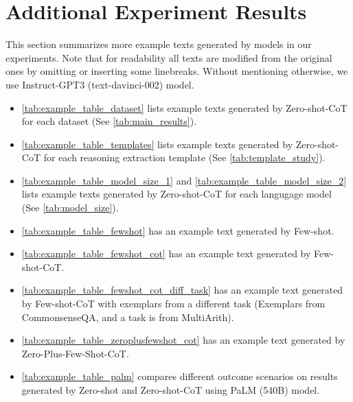 \documentclass{article}
\newcommand{\ours}{Zero-shot-CoT\xspace}
\newcommand{\theirs}{Few-shot-CoT\xspace}
\newcommand{\theirsz}{Zero-shot\xspace}
\newcommand{\theirsf}{Few-shot\xspace}
\begin{document}
\section{Additional Experiment Results}
\label{appx:further_experiment}

This section summarizes more example texts generated by models in our experiments.
Note that for readability all texts are modified from the original ones by omitting or inserting some linebreaks. Without mentioning otherwise, we use Instruct-GPT3 (text-davinci-002) model.

\begin{itemize}
    \item \autoref{tab:example_table_dataset} lists example texts generated by \ours for each dataset (See \autoref{tab:main_results}).
    \item \autoref{tab:example_table_templates} lists example texts generated by \ours for each reasoning extraction template (See \autoref{tab:template_study}).
    \item \autoref{tab:example_table_model_size_1} and \autoref{tab:example_table_model_size_2} lists example texts generated by \ours for each langugage model (See \autoref{tab:model_size}).
    \item \autoref{tab:example_table_fewshot} has an example text generated by \theirsf.
    \item \autoref{tab:example_table_fewshot_cot} has an example text generated by \theirs.
    \item \autoref{tab:example_table_fewshot_cot_diff_task} has an example text generated by \theirs with exemplars from a different task (Exemplars from CommonsenseQA, and a task is from MultiArith).
    \item \autoref{tab:example_table_zeroplusfewshot_cot} has an example text generated by Zero-Plus-Few-Shot-CoT.
    \item \autoref{tab:example_table_palm} compares different outcome scenarios on results generated by \theirsz and \ours using PaLM (540B) model.
\end{itemize}
\end{document}
